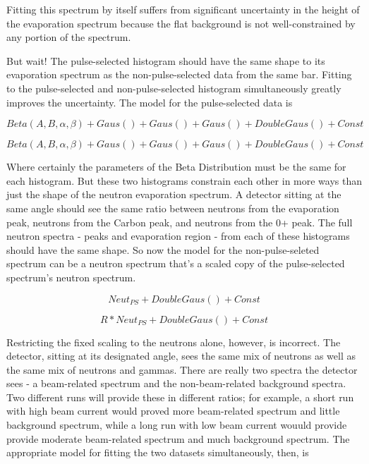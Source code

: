 Fitting this spectrum by itself suffers from significant uncertainty in the height of the evaporation spectrum because the flat background is not well-constrained by any portion of the spectrum.


But wait!  The pulse-selected histogram should have the same shape to its evaporation spectrum as the non-pulse-selected data from the same bar.  Fitting to the pulse-selected and non-pulse-selected histogram simultaneously greatly improves the uncertainty.  The model for the pulse-selected data is

\begin{equation}
Beta(A,B,\alpha,\beta) + Gaus() + Gaus() + Gaus() + DoubleGaus() + Const
\end{equation}

\begin{equation}
Beta(A,B,\alpha,\beta) + Gaus() + Gaus() + Gaus() + DoubleGaus() + Const
\end{equation}

Where certainly the parameters of the Beta Distribution must be the same for each histogram.  But these two histograms constrain each other in more ways than just the shape of the neutron evaporation spectrum.  A detector sitting at the same angle should see the same ratio between neutrons from the evaporation peak, neutrons from the Carbon peak, and neutrons from the 0+ peak.  The full neutron spectra - peaks and evaporation region - from each of these histograms should have the same shape.  So now the model for the non-pulse-seleted spectrum can be a neutron spectrum that's a scaled copy of the pulse-selected spectrum's neutron spectrum.

\begin{equation}
Neut_{PS} + DoubleGaus() + Const
\end{equation}

\begin{equation}
R*Neut_{PS} + DoubleGaus() + Const
\end{equation}

Restricting the fixed scaling to the neutrons alone, however, is incorrect.  The detector, sitting at its designated angle, sees the same mix of neutrons as well as the same mix of neutrons and gammas.  There are really two spectra the detector sees - a beam-related spectrum and the non-beam-related background spectra.  Two different runs will provide these in different ratios; for example, a short run with high beam current would proved more beam-related spectrum and little background spectrum, while a long run with low beam current wouuld provide provide moderate beam-related spectrum and much background spectrum.  The appropriate model for fitting the two datasets simultaneously, then, is

